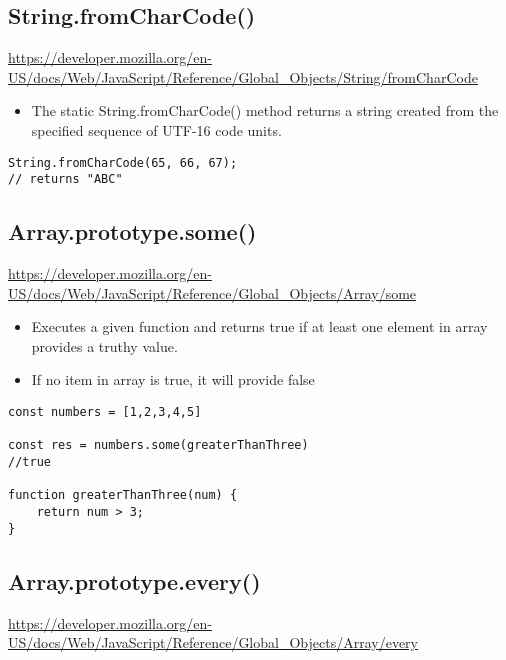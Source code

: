 \documentclass[10pt]{article}
\begin{document}
\medskip %
\pagebreak
\subsection{String.fromCharCode()}

\url{https://developer.mozilla.org/en-US/docs/Web/JavaScript/Reference/Global_Objects/String/fromCharCode}

\begin{itemize}
	\item The static String.fromCharCode() method returns a string created from the specified sequence of UTF-16 code units.
\end{itemize}

\begin{lstlisting}[title=Example fromCharCode(), captionpos=t]
String.fromCharCode(65, 66, 67);   
// returns "ABC"
\end{lstlisting}
\medskip %



\medskip %
\pagebreak
\subsection{Array.prototype.some()}

\url{https://developer.mozilla.org/en-US/docs/Web/JavaScript/Reference/Global_Objects/Array/some}

\begin{itemize}
	\item Executes a given function and returns true if at least one element in array provides a truthy value. 
	\item If no item in array is true, it will provide false
\end{itemize}

\begin{lstlisting}[title=Example some(), captionpos=t]
const numbers = [1,2,3,4,5]

const res = numbers.some(greaterThanThree)
//true

function greaterThanThree(num) {
    return num > 3;
}
\end{lstlisting}
\medskip %


\medskip %
\pagebreak
\subsection{Array.prototype.every()}

\url{https://developer.mozilla.org/en-US/docs/Web/JavaScript/Reference/Global_Objects/Array/every}
\end{document}
